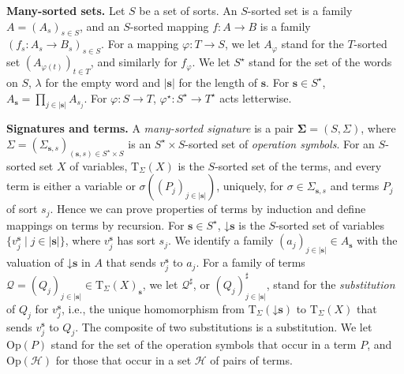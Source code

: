 \documentclass[a4paper,reqno]{amsart}
\newcommand{\bb}[1]{\lvert #1 \rvert}           %
\newcommand{\vs}[1]{\mathbin{\downarrow}#1}      %
\newcommand{\sig}[1]{\mathbf{#1}}                %
\newcommand{\Op}{\mathrm{Op}}
\newcommand{\mor}{\to}
\newcommand{\T}{\mathrm{T}}
\theoremstyle{plain}
\theoremstyle{definition}
\begin{document}
\textbf{Many-sorted sets.}
Let $S$ be a set of sorts.
An $S$-sorted set is a family $A=(A_{s})_{s\in S}$, and an $S$-sorted mapping $f\colon A\mor B$ is a family $(f_{s}\colon A_{s}\mor B_{s})_{s\in S}$.
For a mapping $\varphi\colon T\mor S$, we let $A_{\varphi}$ stand for the $T$-sorted set $(A_{\varphi(t)})_{t\in T}$, and similarly for $f_{\varphi}$.
We let $S^{\star}$ stand for the set of the words on $S$, $\lambda$ for the empty word and $\bb{\mathbf{s}}$ for the length of $\mathbf{s}$.
For $\mathbf{s}\in S^{\star}$, $A_{\mathbf{s}}=\prod_{j\in\bb{\mathbf{s}}}A_{s_{j}}$.
For $\varphi\colon S\mor T$, $\varphi^{\star}\colon S^{\star}\mor T^{\star}$ acts letterwise.

\textbf{Signatures and terms.}
A \emph{many-sorted signature} is a pair $\sig{\Sigma}=(S,\Sigma)$, where $\Sigma=(\Sigma_{\mathbf{s},s})_{(\mathbf{s},s)\in S^{\star}\times S}$ is an $S^{\star}\times S$-sorted set of \emph{operation symbols}.
For an $S$-sorted set $X$ of variables, $\T_{\Sigma}(X)$ is the $S$-sorted set of the terms, and every term is either a variable or $\sigma((P_{j})_{j\in\bb{\mathbf{s}}})$, uniquely, for $\sigma\in\Sigma_{\mathbf{s},s}$ and terms $P_{j}$ of sort $s_{j}$.
Hence we can prove properties of terms by induction and define mappings on terms by recursion.
For $\mathbf{s}\in S^{\star}$, $\vs{\mathbf{s}}$ is the $S$-sorted set of variables $\{v^{\mathbf{s}}_{j}\mid j\in\bb{\mathbf{s}}\}$, where $v^{\mathbf{s}}_{j}$ has sort $s_{j}$.
We identify a family $(a_{j})_{j\in\bb{\mathbf{s}}}\in A_{\mathbf{s}}$ with the valuation of $\vs{\mathbf{s}}$ in $A$ that sends $v^{\mathbf{s}}_{j}$ to $a_{j}$.
For a family of terms $\mathcal{Q}=(Q_{j})_{j\in\bb{\mathbf{s}}}\in\T_{\Sigma}(X)_{\mathbf{s}}$, we let $\mathcal{Q}^{\sharp}$, or $(Q_{j})^{\sharp}_{j\in\bb{\mathbf{s}}}$, stand for the \emph{substitution} of $Q_{j}$ for $v^{\mathbf{s}}_{j}$, i.e., the unique homomorphism from $\T_{\Sigma}(\vs{\mathbf{s}})$ to $\T_{\Sigma}(X)$ that sends $v^{\mathbf{s}}_{j}$ to $Q_{j}$.
The composite of two substitutions is a substitution.
We let $\Op(P)$ stand for the set of the operation symbols that occur in a term $P$, and $\Op(\mathcal{H})$ for those that occur in a set $\mathcal{H}$ of pairs of terms.
\end{document}
